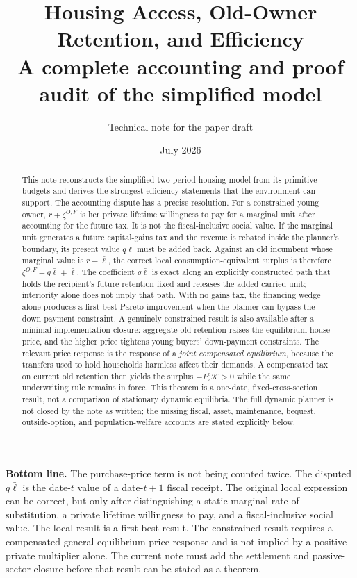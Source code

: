 \documentclass[11pt]{article}
\title{\textbf{Housing Access, Old-Owner Retention, and Efficiency}\\[0.35em]
\large A complete accounting and proof audit of the simplified model}
\author{Technical note for the paper draft}
\date{July 2026}
\newcommand{\1}{\mathbf 1}
\begin{document}
\maketitle

\begin{abstract}
This note reconstructs the simplified two-period housing model from its
primitive budgets and derives the strongest efficiency statements that the
environment can support. The accounting dispute has a precise resolution.
For a constrained young owner, $r+\zeta^{O,F}$ is her private lifetime
willingness to pay for a marginal unit after accounting for the future tax.
It is not the fiscal-inclusive social value. If the marginal unit generates a
future capital-gains tax and the revenue is rebated inside the planner's
boundary, its present value $q\bar\ell$ must be added back. Against an old
incumbent whose marginal value is $r-\bar\ell$, the correct local
consumption-equivalent surplus is therefore
\(\zeta^{O,F}+q\bar\ell+\bar\ell\). The coefficient $q\bar\ell$ is exact
along an explicitly constructed path that holds the recipient's future
retention fixed and releases the added carried unit; interiority alone does not
imply that path. With no gains tax, the financing wedge alone produces a
first-best Pareto improvement when the planner can bypass the down-payment
constraint. A genuinely constrained result is also available after a minimal
implementation closure: aggregate old retention raises the equilibrium house
price, and the higher price tightens young buyers' down-payment constraints.
The relevant price response is the response of a \emph{joint compensated
equilibrium}, because the transfers used to hold households harmless affect
their demands. A compensated tax on current old retention then yields the
surplus $-P_\tau^c\mathcal K>0$ while the same underwriting rule remains in
force. This theorem is a one-date, fixed-cross-section result, not a comparison
of stationary dynamic equilibria. The full dynamic planner is not closed by
the note as written; the missing fiscal, asset, maintenance, bequest,
outside-option, and population-welfare accounts are stated explicitly below.
\end{abstract}

\vspace{0.35em}
\begin{center}
\begin{minipage}{0.94\textwidth}
\small
\textbf{Bottom line.} The purchase-price term is not being counted twice.
The disputed $q\bar\ell$ is the date-$t$ value of a date-$t+1$ fiscal receipt.
The original local expression can be correct, but only after distinguishing a
static marginal rate of substitution, a private lifetime willingness to pay,
and a fiscal-inclusive social value. The local result is a first-best result.
The constrained result requires a compensated general-equilibrium price
response and is not implied by a positive private multiplier alone. The
current note must add the settlement and passive-sector closure before that
result can be stated as a theorem.
\end{minipage}
\end{center}
\end{document}
